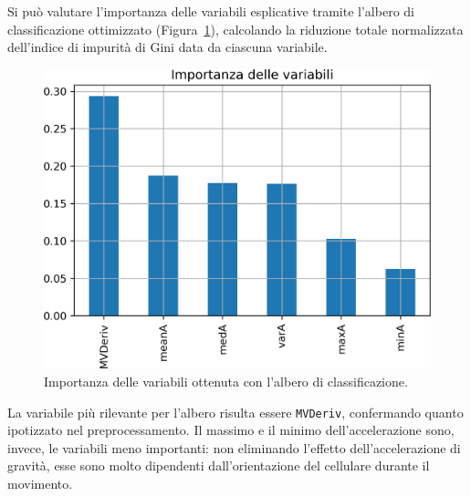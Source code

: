 \documentclass[main.tex]{subfiles}
\begin{document}
Si può valutare l'importanza delle variabili esplicative tramite l'albero di classificazione ottimizzato (Figura~\ref{fig:importance-Tree}), calcolando la riduzione totale normalizzata dell'indice di impurità di Gini data da ciascuna variabile\cite{DecisionTreeClassifier}.
\begin{figure}[H]
	\centering
	\includegraphics[width=0.82\confusion]{../../figure/importance-Tree.png}
	\caption{Importanza delle variabili ottenuta con l'albero di classificazione.}
	\label{fig:importance-Tree}
\end{figure}
La variabile più rilevante per l'albero risulta essere \texttt{MVDeriv}, confermando quanto ipotizzato nel preprocessamento. Il massimo e il minimo dell'accelerazione sono, invece, le variabili meno importanti: non eliminando l'effetto dell'accelerazione di gravità, esse sono molto dipendenti dall'orientazione del cellulare durante il movimento.
\end{document}
